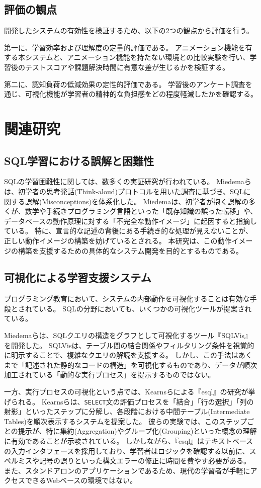 \documentclass[uplatex,a4paper,12pt]{ujreport}
\begin{document}
\subsection{評価の観点}
開発したシステムの有効性を検証するため、以下の2つの観点から評価を行う。
\par
第一に、学習効率および理解度の定量的評価である。
アニメーション機能を有する本システムと、アニメーション機能を持たない環境との比較実験を行い、学習後のテストスコアや課題解決時間に有意な差が生じるかを検証する。
\par
第二に、認知負荷の低減効果の定性的評価である。
学習後のアンケート調査を通じ、可視化機能が学習者の精神的な負担感をどの程度軽減したかを確認する。

\section{関連研究}
\subsection{SQL学習における誤解と困難性}
SQLの学習困難性に関しては、数多くの実証研究が行われている。
Miedemaら\cite{on-learning-sql}は、初学者の思考発話(Think-aloud)プロトコルを用いた調査に基づき、SQLに関する誤解(Misconceptions)を体系化した。
Miedemaは、初学者が抱く誤解の多くが、数学や手続きプログラミング言語といった「既存知識の誤った転移」や、データベースの動作原理に対する「不完全な動作イメージ」に起因すると指摘している。
特に、宣言的な記述の背後にある手続き的な処理が見えないことが、正しい動作イメージの構築を妨げているとされる。
本研究は、この動作イメージの構築を支援するための具体的なシステム開発を目的とするものである。
\subsection{可視化による学習支援システム}
プログラミング教育において、システムの内部動作を可視化することは有効な手段とされている。
SQLの分野においても、いくつかの可視化ツールが提案されている。
\par
Miedemaらは、SQLクエリの構造をグラフとして可視化するツール『SQLVis』を開発した\cite{on-learning-sql}。
SQLVisは、テーブル間の結合関係やフィルタリング条件を視覚的に明示することで、複雑なクエリの解読を支援する。
しかし、この手法はあくまで「記述された静的なコードの構造」を可視化するものであり、データが順次加工されている「動的な実行プロセス」を提示するものではない。
\par
一方、実行プロセスの可視化という点では、Kearnsらによる『esql』の研究\cite{teaching-system-for-sql}が挙げられる。
Kearnsらは、\texttt{SELECT}文の評価プロセスを「結合」「行の選択」「列の射影」といったステップに分解し、各段階における中間テーブル(Intermediate Tables)を順次表示するシステムを提案した。
彼らの実験では、このステップごとの提示が、特に集約(Aggregation)やグループ化(Grouping)といった概念の理解に有効であることが示唆されている。
しかしながら、『esql』はテキストベースの入力インタフェースを採用しており、学習者はロジックを確認する以前に、スペルミスや記号の誤りといった構文エラーの修正に時間を費やす必要がある。
また、スタンドアロンのアプリケーションであるため、現代の学習者が手軽にアクセスできるWebベースの環境ではない。
\end{document}
